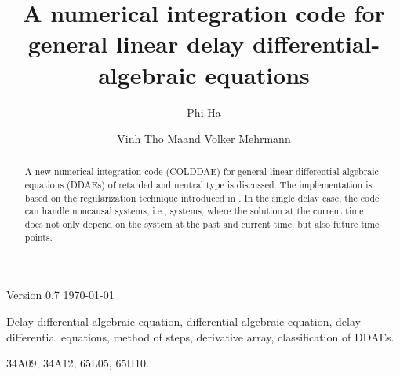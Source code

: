 \documentclass[final,reqno]{siamltex}
\begin{document}
\title{A numerical integration code for general linear delay differential-algebraic equations\footnotemark[1]}

\author{Phi Ha\footnotemark[2] \and Vinh Tho Ma\footnotemark[2] and Volker Mehrmann\footnotemark[2]}

\renewcommand{\thefootnote}{\fnsymbol{footnote}}


\maketitle

\newcommand{\thedate}{Version 0.7 \quad \today}

\begin{center}
\thedate
\end{center}

\vskip 0.2cm

\begin{abstract}
A new numerical integration code (COLDDAE) for general linear differential-algebraic equations
(DDAEs) of retarded and neutral type is discussed. The implementation is based on the regularization technique introduced in
\cite{HaM14}. In the single delay case, the code can handle noncausal systems, i.e., systems, where the
solution at the current time does not only depend on the system at the past and current time,
but also future time points.
\end{abstract}

\begin{keywords} Delay differential-algebraic equation, differential-algebraic equation, delay differential
equations, method of steps, derivative array, classification of DDAEs.
\end{keywords}

\begin{AMS}
34A09, 34A12, 65L05, 65H10.
\end{AMS}

\pagestyle{myheadings}
\thispagestyle{plain}
\end{document}
